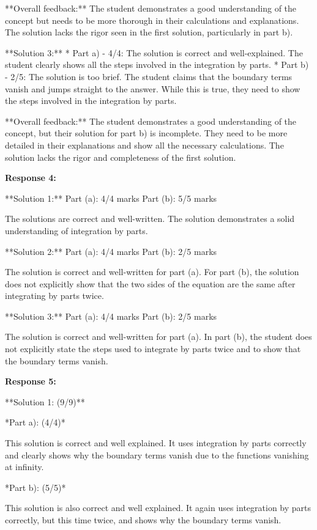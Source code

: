 \documentclass[a4paper,11pt]{article}
\begin{document}
**Overall feedback:** The student demonstrates a good understanding of the concept but needs to be more thorough in their calculations and explanations. The solution lacks the rigor seen in the first solution, particularly in part b). 

**Solution 3:**
*   Part a) - 4/4: The solution is correct and well-explained. The student clearly shows all the steps involved in the integration by parts.
*   Part b) - 2/5: The solution is too brief. The student claims that the boundary terms vanish and jumps straight to the answer. While this is true, they need to show the steps involved in the integration by parts. 

**Overall feedback:** The student demonstrates a good understanding of the concept, but their solution for part b) is incomplete. They need to be more detailed in their explanations and show all the necessary calculations. The solution lacks the rigor and completeness of the first solution.

\bigskip    
\textbf{Response 4:}

**Solution 1:**
Part (a): 4/4 marks
Part (b): 5/5 marks

The solutions are correct and well-written. The solution demonstrates a solid understanding of integration by parts.  

**Solution 2:**
Part (a): 4/4 marks
Part (b): 2/5 marks

The solution is correct and well-written for part (a). For part (b), the solution does not explicitly show that the two sides of the equation are the same after integrating by parts twice.

**Solution 3:**
Part (a): 4/4 marks
Part (b): 2/5 marks

The solution is correct and well-written for part (a). In part (b), the student does not explicitly state the steps used to integrate by parts twice and to show that the boundary terms vanish.

\bigskip    
\textbf{Response 5:}

**Solution 1: (9/9)**

*Part a): (4/4)*

This solution is correct and well explained. It uses integration by parts correctly and clearly shows why the boundary terms vanish due to the functions vanishing at infinity.

*Part b): (5/5)*

This solution is also correct and well explained. It again uses integration by parts correctly, but this time twice, and shows why the boundary terms vanish.
\end{document}
